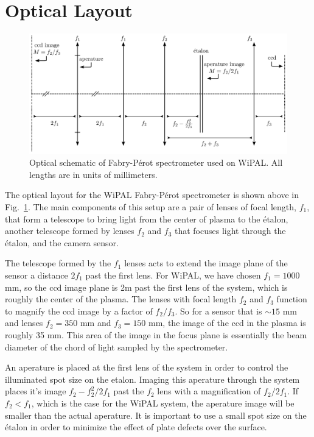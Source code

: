 \documentclass{article}
\begin{document}

\section{Optical Layout}
\begin{figure}
\includegraphics[width=\textwidth]{Images/OpticalLayout.png}
\caption{Optical schematic of Fabry-P\'{e}rot spectrometer used on WiPAL. All lengths are in units of millimeters. \label{fig:opticalsetup}}
\end{figure}
The optical layout for the WiPAL Fabry-P\'{e}rot spectrometer is shown above in Fig.~\ref{fig:opticalsetup}. The main components of this setup are a pair of lenses of focal length, $f_{1}$, that form a telescope to bring light from the center of plasma to the \'{e}talon, another telescope formed by lenses $f_{2}$ and $f_{3}$ that focuses light through the \'{e}talon, and the camera sensor.

The telescope formed by the $f_{1}$ lenses acts to extend the image plane of the sensor a distance $2f_{1}$ past the first lens. For WiPAL, we have chosen $f_{1}=1000$ mm, so the ccd image plane is 2m past the first lens of the system, which is roughly the center of the plasma. The lenses with focal length $f_{2}$ and $f_{3}$ function to magnify the ccd image by a factor of $f_{2}/f_{3}$. So for a sensor that is $\sim15$ mm and lenses $f_{2}=350$ mm and $f_{3}=150$ mm, the image of the ccd in the plasma is roughly 35 mm. This area of the image in the focus plane is essentially the beam diameter of the chord of light sampled by the spectrometer.

An aperature is placed at the first lens of the system in order to control the illuminated spot size on the etalon. Imaging this aperature through the system places it's image $f_{2}-f_{2}^{2}/2f_{1}$  past the $f_{2}$ lens with a magnification of $f_{2}/2f_{1}$. If $f_{2}<f_{1}$, which is the case for the WiPAL system, the aperature image will be smaller than the actual aperature. It is important to use a small spot size on the \'{e}talon in order to minimize the effect of plate defects over the surface.
\end{document}

